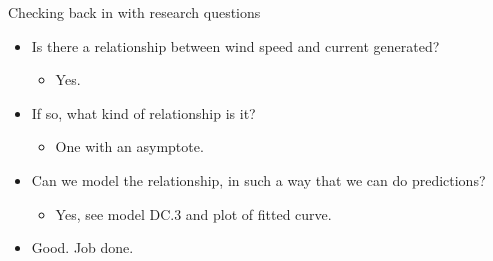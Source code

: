 \documentclass[
  ignorenonframetext,
]{beamer}
\providecommand{\tightlist}{%
  \setlength{\itemsep}{0pt}\setlength{\parskip}{0pt}}
\begin{document}
\begin{frame}{Checking back in with research questions}
\protect\hypertarget{checking-back-in-with-research-questions}{}

\begin{itemize}
\tightlist
\item
  Is there a relationship between wind speed and current generated?

  \begin{itemize}
  \tightlist
  \item
    Yes.
  \end{itemize}
\item
  If so, what kind of relationship is it?

  \begin{itemize}
  \tightlist
  \item
    One with an asymptote.
  \end{itemize}
\item
  Can we model the relationship, in such a way that we can do
  predictions?

  \begin{itemize}
  \tightlist
  \item
    Yes, see model DC.3 and plot of fitted curve.
  \end{itemize}
\item
  Good. Job done.
\end{itemize}

\end{frame}
\end{document}
